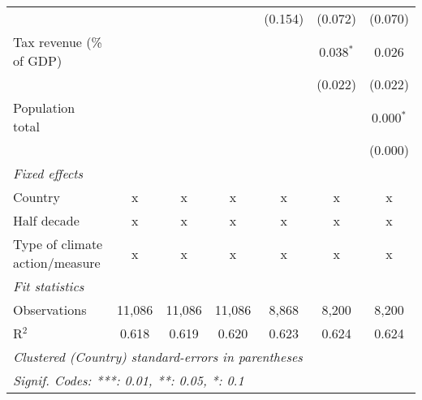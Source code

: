 \begin{tabular}{lcccccc}
                                                            &         &               &                & (0.154)        & (0.072)        & (0.070)\\   
   Tax revenue (\% of GDP)                                  &         &               &                &                & 0.038$^{*}$    & 0.026\\   
                                                            &         &               &                &                & (0.022)        & (0.022)\\   
   Population total                                         &         &               &                &                &                & 0.000$^{*}$\\   
                                                            &         &               &                &                &                & (0.000)\\   
   \emph{Fixed effects}\\
   Country                                                  & x       & x             & x              & x              & x              & x\\  
   Half decade                                              & x       & x             & x              & x              & x              & x\\  
   Type of climate action/measure                           & x       & x             & x              & x              & x              & x\\  
   \midrule \emph{Fit statistics}\\
   Observations                                             & 11,086  & 11,086        & 11,086         & 8,868          & 8,200          & 8,200\\  
   R$^2$                                                    & 0.618   & 0.619         & 0.620          & 0.623          & 0.624          & 0.624\\  
   \midrule
   \multicolumn{7}{l}{\emph{Clustered (Country) standard-errors in parentheses}}\\
   \multicolumn{7}{l}{\emph{Signif. Codes: ***: 0.01, **: 0.05, *: 0.1}}\\
\end{tabular}
\par\endgroup


